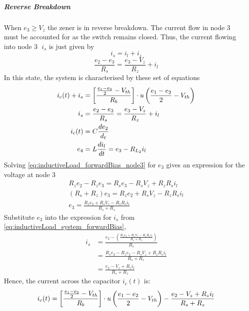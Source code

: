 \subparagraph{Reverse Breakdown}
When $e_3 \geq V_z$ the zener is in reverse breakdown. The current flow in node \textcircled{3} must be accounted for as the switch remains closed. Thus, the current flowing into node \textcircled{3} $i_s$ is just given by $$i_s = i_l + i_z$$
\begin{equation}
	\frac{e_2 - e_3}{R_s} = \frac{e_3 - V_z}{R_z} + i_l
	\label{eq:inductiveLoad_forwardBias_node3}
\end{equation}
In this state, the system is characterised by these set of equations
\begin{equation}
	\begin{split}
		i_c(t) + i_s &= \left[\frac{\frac{e_1 - e_2}{2} - V_{th}}{R_b} \right]\cdot u\left(\frac{e_1 - e_2}{2} - V_{th} \right) \\
		i_s &= \frac{e_2 - e_3}{R_s} = \frac{e_3 - V_z}{R_z} + i_l \\
		i_c(t) &= C \frac{de_2}{d_t} \\
		e_4 &= L\frac{di_l}{dt} = e_3 - R_{L_2}i_l
	\end{split}
	\label{eq:inductiveLoad_system_forwardBias}
\end{equation}
Solving \eqref{eq:inductiveLoad_forwardBias_node3} for $e_3$ gives an expression for the voltage at node \textcircled{3}
\begin{equation}
	\begin{split}
		R_z e_2 - R_z e_3 = R_s e_3 - R_s V_z + R_z R_s i_l \\
		(R_s + R_z) e_3 = R_z e_2 + R_s V_z - R_z R_s i_l \\
		e_3 = \frac{R_z e_2 + R_s V_z - R_z R_s i_l}{R_s + R_z}
	\end{split}
	\label{eq:inductiveLoad_forwardBias_e3}
\end{equation}
Substitute $e_3$ into the expression for $i_s$ from \eqref{eq:inductiveLoad_system_forwardBias},
\begin{equation}
	\begin{split}
		i_s &= \frac{e_2 - \left(\frac{R_z e_2 + R_s V_z - R_z R_s i_l}{R_s + R_z}\right)}{R_s} \\
		    &= \frac{R_s e_2 - R_z e_2 - R_s V_z + R_z R_s i_l}{R_s + R_z} \\
		    &= \frac{e_2 - V_z + R_z i_l}{R_s + R_z}
	\end{split}
\end{equation}
Hence, the current across the capacitor $i_c(t)$ is:
\begin{equation}
	i_c(t) = \left[\frac{\frac{e_1 - e_2}{2} - V_{th}}{R_b} \right]\cdot u\left(\frac{e_1 - e_2}{2} - V_{th} \right) - \frac{e_2 - V_z + R_z i_l}{R_s + R_z}
\end{equation}
